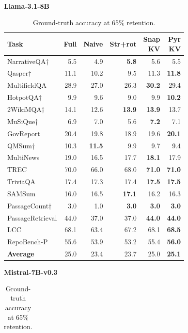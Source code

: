 \documentclass[10pt,letterpaper]{article}
\begin{document}
\begin{table}[H]
\centering
\small
\captionsetup{justification=centering}
\caption{Ground-truth accuracy at 65\% retention.}
\label{tab:gt}
\begin{minipage}[t]{0.49\textwidth}
\centering
\textbf{Llama-3.1-8B}\\[0.4em]
\begin{tabular}{@{}lrrrrr@{}}
\toprule
Task & Full & Naive & Str+rot & \makecell{Snap\\KV} & \makecell{Pyr\\KV}\\
\midrule
NarrativeQA† & 5.5 & 4.9 & \textbf{5.8} & 5.6 & 5.5\\
Qasper† & 11.1 & 10.2 & 9.5 & 11.3 & \textbf{11.8}\\
MultifieldQA & 28.9 & 27.0 & 26.3 & \textbf{30.2} & 29.4\\
HotpotQA† & 9.9 & 9.6 & 9.0 & 9.9 & \textbf{10.2}\\
2WikiMQA† & 14.1 & 12.6 & \textbf{13.9} & \textbf{13.9} & 13.7\\
MuSiQue† & 6.9 & 7.0 & 5.6 & \textbf{7.2} & 7.1\\
GovReport & 20.4 & 19.8 & 18.9 & 19.6 & \textbf{20.1}\\
QMSum† & 10.3 & \textbf{11.5} & 9.9 & 9.7 & 9.4\\
MultiNews & 19.0 & 16.5 & 17.7 & \textbf{18.1} & 17.9\\
TREC & 70.0 & 66.0 & 68.0 & \textbf{71.0} & \textbf{71.0}\\
TriviaQA & 17.4 & 17.3 & 17.4 & \textbf{17.5} & \textbf{17.5}\\
SAMSum & 16.0 & 16.5 & \textbf{17.1} & 16.2 & 16.3\\
PassageCount† & 3.0 & 1.0 & \textbf{3.0} & \textbf{3.0} & \textbf{3.0}\\
PassageRetrieval & 44.0 & 37.0 & 37.0 & \textbf{44.0} & \textbf{44.0}\\
LCC & 68.1 & 63.4 & 67.2 & 68.1 & \textbf{68.5}\\
RepoBench-P & 55.6 & 53.9 & 53.2 & 55.4 & \textbf{56.0}\\
\midrule
\textbf{Average} & 25.0 & 23.4 & 23.7 & 25.0 & \textbf{25.1}\\
\bottomrule
\end{tabular}
\end{minipage}%
\hfill
\begin{minipage}[t]{0.49\textwidth}
\centering
\textbf{Mistral-7B-v0.3}\\[0.4em]
\begin{tabular}{@{}lrrrrr@{}}

\end{tabular}
\end{minipage}
\end{table}
\end{document}
